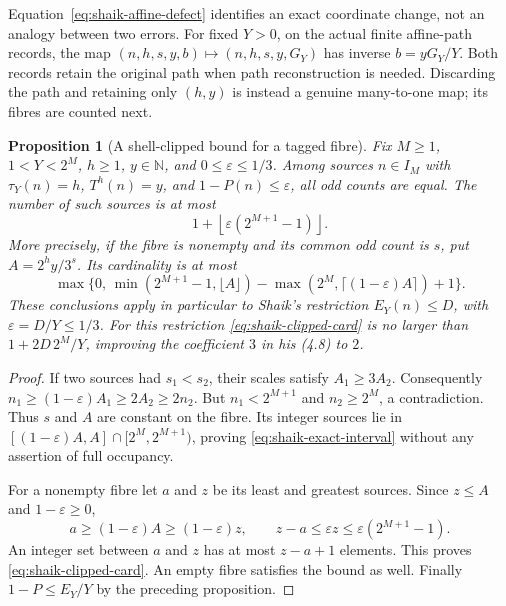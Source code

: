 \documentclass[11pt]{article}
\newtheorem{proposition}{Proposition}
\theoremstyle{remark}\newtheorem{remark}[proposition]{Remark}
\newcommand{\NN}{\mathbb N}
\begin{document}
Equation~\eqref{eq:shaik-affine-defect} identifies an exact coordinate
change, not an analogy between two errors. For fixed \(Y>0\), on the
actual finite affine-path records, the map
\((n,h,s,y,b)\mapsto(n,h,s,y,G_Y)\) has inverse \(b=yG_Y/Y\).
Both records retain the original path when path reconstruction is needed.
Discarding the path and retaining only \((h,y)\) is instead a genuine
many-to-one map; its fibres are counted next.

\begin{proposition}[A shell-clipped bound for a tagged fibre]
\label{prop:shaik-clipped-fibre}
Fix \(M\ge1\), \(1<Y<2^M\), \(h\ge1\), \(y\in\NN\), and
\(0\le\varepsilon\le1/3\). Among sources \(n\in I_M\) with
\(\tau_Y(n)=h\), \(T^h(n)=y\), and \(1-P(n)\le\varepsilon\),
all odd counts are equal. The number of such sources is at most
\begin{equation}\label{eq:shaik-clipped-card}
 1+\left\lfloor\varepsilon(2^{M+1}-1)\right\rfloor.
\end{equation}
More precisely, if the fibre is nonempty and its common odd count is \(s\),
put \(A=2^h y/3^s\). Its cardinality is at most
\begin{equation}\label{eq:shaik-exact-interval}
 \max\{0,\,
 \min(2^{M+1}-1,\lfloor A\rfloor)
 -\max(2^M,\lceil(1-\varepsilon)A\rceil)+1\}.
\end{equation}
These conclusions apply in particular to Shaik's restriction
\(E_Y(n)\le D\), with \(\varepsilon=D/Y\le1/3\).
For this restriction \eqref{eq:shaik-clipped-card} is no larger than
\(1+2D\,2^M/Y\), improving the coefficient \(3\) in his (4.8) to \(2\).
\end{proposition}
\begin{proof}
If two sources had \(s_1<s_2\), their scales satisfy \(A_1\ge3A_2\).
Consequently
\(n_1\ge(1-\varepsilon)A_1\ge2A_2\ge2n_2\).
But \(n_1<2^{M+1}\) and \(n_2\ge2^M\), a contradiction. Thus \(s\)
and \(A\) are constant on the fibre. Its integer sources lie in
\([(1-\varepsilon)A,A]\cap[2^M,2^{M+1})\), proving
\eqref{eq:shaik-exact-interval} without any assertion of full occupancy.

For a nonempty fibre let \(a\) and \(z\) be its least and greatest
sources. Since \(z\le A\) and \(1-\varepsilon\ge0\),
\[
 a\ge(1-\varepsilon)A\ge(1-\varepsilon)z,\qquad
 z-a\le\varepsilon z\le\varepsilon(2^{M+1}-1).
\]
An integer set between \(a\) and \(z\) has at most \(z-a+1\) elements.
This proves \eqref{eq:shaik-clipped-card}. An empty fibre satisfies the
bound as well. Finally \(1-P\le E_Y/Y\) by the preceding proposition.
\end{proof}
\end{document}
